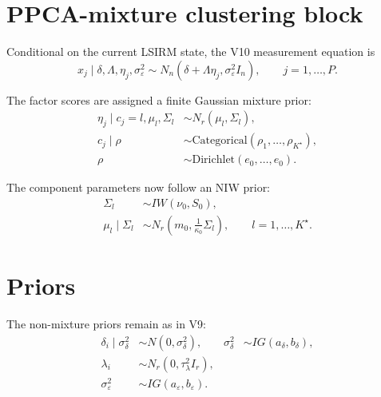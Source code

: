 \documentclass[11pt]{article}
\begin{document}
\section{PPCA-mixture clustering block}

Conditional on the current LSIRM state, the V10 measurement equation is
\begin{equation}
    x_j\mid\delta,\Lambda,\eta_j,\sigma_\varepsilon^2
    \sim
    N_n(\delta+\Lambda\eta_j,\sigma_\varepsilon^2 I_n),
    \qquad j=1,\dots,P.
    \label{eq:v10-measurement}
\end{equation}

The factor scores are assigned a finite Gaussian mixture prior:
\begin{align}
    \eta_j\mid c_j=l,\mu_l,\Sigma_l
    &\sim N_r(\mu_l,\Sigma_l),\label{eq:v10-eta-mixture}\\
    c_j\mid\rho
    &\sim \mathrm{Categorical}(\rho_1,\dots,\rho_{K^\star}),\\
    \rho
    &\sim \mathrm{Dirichlet}(e_0,\dots,e_0).
\end{align}

The component parameters now follow an NIW prior:
\begin{align}
    \Sigma_l &\sim IW(\nu_0,S_0),\label{eq:niw-sigma-prior}\\
    \mu_l\mid\Sigma_l &\sim
    N_r\left(m_0,\frac{1}{\kappa_0}\Sigma_l\right),
    \qquad l=1,\dots,K^\star.\label{eq:niw-mu-prior}
\end{align}

\section{Priors}

The non-mixture priors remain as in V9:
\begin{align}
    \delta_i\mid\sigma_\delta^2 &\sim N(0,\sigma_\delta^2), &
    \sigma_\delta^2 &\sim IG(a_\delta,b_\delta),\\
    \lambda_i &\sim N_r(0,\tau_\lambda^2 I_r),\\
    \sigma_\varepsilon^2 &\sim IG(a_\varepsilon,b_\varepsilon).
\end{align}
\end{document}
